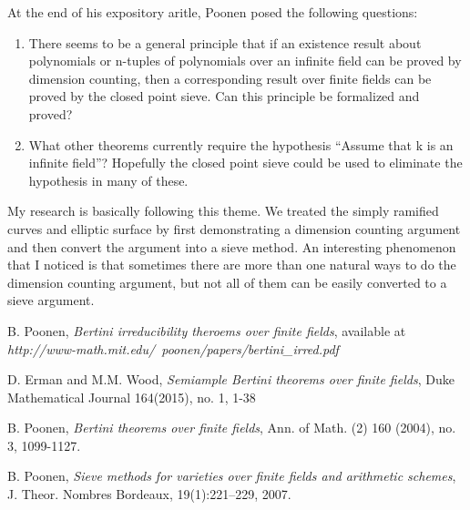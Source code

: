 \documentclass[12pt]{article}
\theoremstyle{plain}
\theoremstyle{definition}
\newcommand{\<}{\langle}
\renewcommand{\>}{\rangle}
\begin{document}
At the end of his expository aritle, Poonen posed the following questions:
\begin{enumerate}
\item There seems to be a general principle that if an existence result about polynomials
or n-tuples of polynomials over an infinite field can be proved by dimension counting,
then a corresponding result over finite fields can be proved by the closed point sieve.
Can this principle be formalized and proved?

\item What other theorems currently require the hypothesis “Assume that k is an infinite
field”? Hopefully the closed point sieve could be used to eliminate the hypothesis in
many of these.
\end{enumerate}

My research is basically following this theme. We treated the simply ramified curves and elliptic surface by first demonstrating a dimension counting argument and then convert the argument into a sieve method. An interesting phenomenon that I noticed is that sometimes there are more than one natural ways to do the dimension counting argument, but not all of them can be easily converted to a sieve argument. 


\begin{thebibliography}{9}
B. Poonen, \textit{Bertini irreducibility theroems over finite fields}, available at \textit{http://www-math.mit.edu/~poonen/papers/bertini\_irred.pdf}

D. Erman and M.M. Wood, \textit{Semiample Bertini theorems over finite fields}, Duke Mathematical Journal 164(2015), no. 1, 1-38

B. Poonen, \textit{Bertini theorems over finite fields}, Ann. of Math. (2) 160 (2004), no. 3, 1099-1127.

B. Poonen, \textit{Sieve methods for varieties over finite fields and arithmetic schemes}, J. Theor. Nombres Bordeaux, 19(1):221–229, 2007.


\end{thebibliography}
\end{document}
